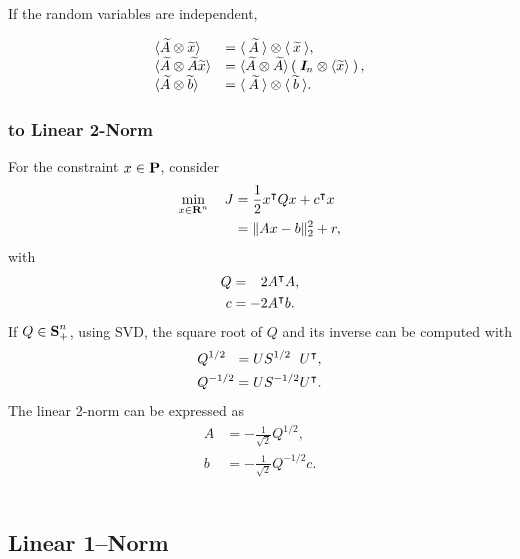 \documentclass{article}
\begin{document}
    If the random variables are independent,

    \begin{align*}
        \begin{array}{ll}
            \langle\widetilde{A}\otimes \widetilde{x}\rangle
                &=\langle\:\widetilde{A}\:\rangle\otimes \langle\:\widetilde{x}\:\rangle,\\
            \langle \widetilde{A} \otimes \widetilde{A}\widetilde{x} \rangle
                &=\langle\widetilde{A}\otimes \widetilde{A}\rangle\left(\:\emph{\textbf{I}}_n\otimes \langle\widetilde{x}\rangle\:\right),\\
            \langle\widetilde{A} \otimes \widetilde{b}\rangle
                &=\langle\:\widetilde{A}\:\rangle \otimes \langle\:\widetilde{b}\:\rangle.
        \end{array}
    \end{align*}

\clearpage

\subsubsection{\QP to Linear 2-Norm}

    For the constraint $x\in\textbf{P}$, consider
    \begin{align*}
        \min_{x\in\textbf{R}^n}\quad J&=\frac{1}{2} x^\intercal Q x + c^\intercal x\\
        &=\|Ax-b\|_2^2+r,
    \end{align*}    
    with    
    \begin{align*}
        Q&=\minus 2A^\tp A,\\
        c&=-2A^\tp b.
    \end{align*}
    If $Q\in\textbf{S}^n_+$,
    using SVD, the square root of $Q$
    and its inverse can be computed with
    \begin{align*}
        Q^{1/2\minus}&=US^{1/2\minus} U^\tp,\\
        Q^{-1/2}&=U S^{-1/2} U^\tp.
    \end{align*}    
    The linear 2-norm can be expressed as
    \begin{align*}
        A&=\minus\frac{1}{\sqrt{2}}Q^{1/2},\\
        b&= -\frac{1}{\sqrt{2}}Q^{-1/2} c.
    \end{align*}
    \\

\subsection{Linear 1--Norm}
\end{document}
